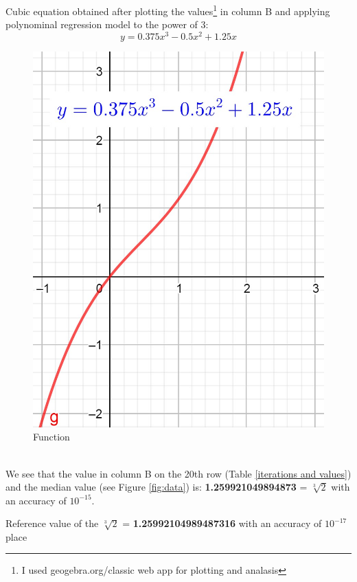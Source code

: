 \documentclass[12pt, letterpaper, oneside]{report}
\begin{document}
Cubic equation obtained after plotting the values\footnote{I used geogebra.org/classic web app for plotting and analasis } in column B and applying polynominal regression model to the power of 3:
\begin{equation}
y=0.375x^{3}-0.5x^{2}+1.25x
\end{equation}
\begin{figure}[h]
	\centering
	\includegraphics[width=0.2\linewidth]{images/g_x_func.jpg}
	\caption{Function}
	\label{fig:function}
\end{figure}\\
\newpage
We see that the value in column B on the 20th row (Table   \ref{iterations and values}) and the median value (see Figure \ref{fig:data}) is:  \textbf{1.259921049894873} = $\sqrt[3]{2}$ with an accuracy of $10^{-15}$.
\vspace{10pt}
\\
\begin{center}
	Reference value of the $\sqrt[3]{2}$ = \textbf{1.25992104989487316} with an accuracy of $10^{-17}$ place
\end{center}
\vspace{10pt}


\end{document}
